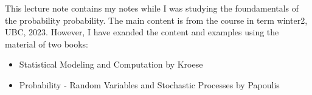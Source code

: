 \documentclass[12pt]{article}
\begin{document}

This lecture note contains my notes while I was studying the foundamentals of the probability probability. The main content is from the course in term winter2, UBC, 2023. However, I have exanded the content and examples using the material of two books: 



\begin{itemize}
\item Statistical Modeling and Computation by Kroese
\item Probability - Random Variables and Stochastic Processes by Papoulis
\end{itemize}



\newpage

\end{document}
